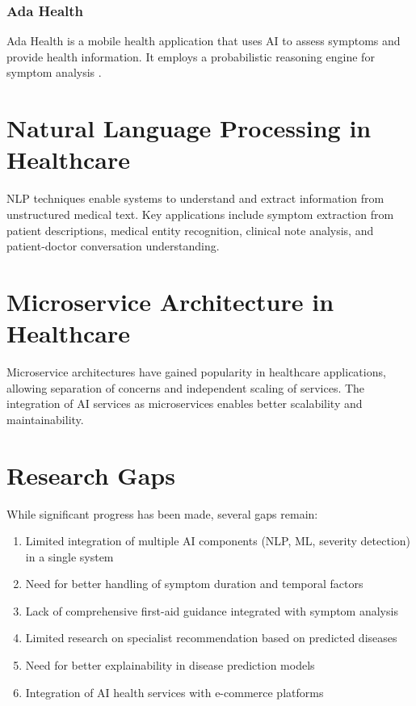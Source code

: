 \documentclass[12pt,a4paper]{article}
\begin{document}
\subsubsection{Ada Health}
Ada Health is a mobile health application that uses AI to assess symptoms and provide health information. It employs a probabilistic reasoning engine for symptom analysis \cite{adahealth}.

\section{Natural Language Processing in Healthcare}
NLP techniques enable systems to understand and extract information from unstructured medical text. Key applications include symptom extraction from patient descriptions, medical entity recognition, clinical note analysis, and patient-doctor conversation understanding.

\section{Microservice Architecture in Healthcare}
Microservice architectures have gained popularity in healthcare applications, allowing separation of concerns and independent scaling of services. The integration of AI services as microservices enables better scalability and maintainability.

\section{Research Gaps}
While significant progress has been made, several gaps remain:

\begin{enumerate}
    \item Limited integration of multiple AI components (NLP, ML, severity detection) in a single system
    \item Need for better handling of symptom duration and temporal factors
    \item Lack of comprehensive first-aid guidance integrated with symptom analysis
    \item Limited research on specialist recommendation based on predicted diseases
    \item Need for better explainability in disease prediction models
    \item Integration of AI health services with e-commerce platforms
\end{enumerate}
\end{document}
